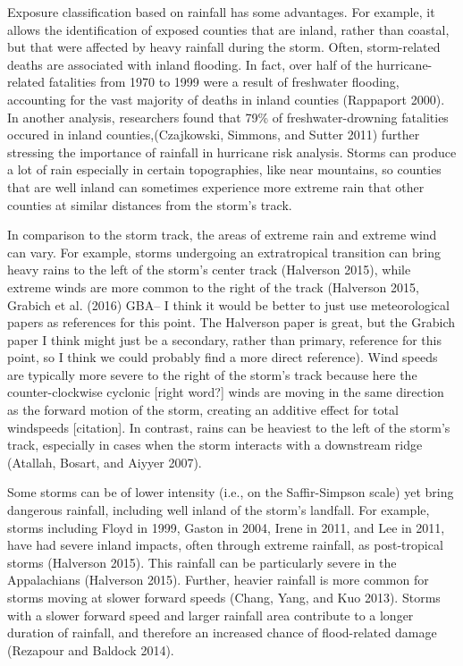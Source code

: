\documentclass[]{elsarticle} %
\begin{document}
Exposure classification based on rainfall has some advantages. For
example, it allows the identification of exposed counties that are
inland, rather than coastal, but that were affected by heavy rainfall
during the storm. Often, storm-related deaths are associated with inland
flooding. In fact, over half of the hurricane-related fatalities from
1970 to 1999 were a result of freshwater flooding, accounting for the
vast majority of deaths in inland counties (Rappaport 2000). In another
analysis, researchers found that 79\% of freshwater-drowning fatalities
occured in inland counties,(Czajkowski, Simmons, and Sutter 2011)
further stressing the importance of rainfall in hurricane risk analysis.
Storms can produce a lot of rain especially in certain topographies,
like near mountains, so counties that are well inland can sometimes
experience more extreme rain that other counties at similar distances
from the storm's track.

In comparison to the storm track, the areas of extreme rain and extreme
wind can vary. For example, storms undergoing an extratropical
transition can bring heavy rains to the left of the storm's center track
(Halverson 2015), while extreme winds are more common to the right of
the track (Halverson 2015, Grabich et al. (2016) GBA-- I think it would
be better to just use meteorological papers as references for this
point. The Halverson paper is great, but the Grabich paper I think might
just be a secondary, rather than primary, reference for this point, so I
think we could probably find a more direct reference). Wind speeds are
typically more severe to the right of the storm's track because here the
counter-clockwise cyclonic {[}right word?{]} winds are moving in the
same direction as the forward motion of the storm, creating an additive
effect for total windspeeds {[}citation{]}. In contrast, rains can be
heaviest to the left of the storm's track, especially in cases when the
storm interacts with a downstream ridge (Atallah, Bosart, and Aiyyer
2007).

Some storms can be of lower intensity (i.e., on the Saffir-Simpson
scale) yet bring dangerous rainfall, including well inland of the
storm's landfall. For example, storms including Floyd in 1999, Gaston in
2004, Irene in 2011, and Lee in 2011, have had severe inland impacts,
often through extreme rainfall, as post-tropical storms (Halverson
2015). This rainfall can be particularly severe in the Appalachians
(Halverson 2015). Further, heavier rainfall is more common for storms
moving at slower forward speeds (Chang, Yang, and Kuo 2013). Storms with
a slower forward speed and larger rainfall area contribute to a longer
duration of rainfall, and therefore an increased chance of flood-related
damage (Rezapour and Baldock 2014).
\end{document}
